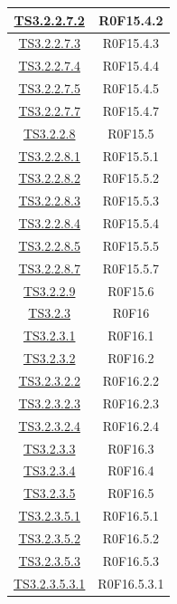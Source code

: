 \documentclass[../PianoDiQualifica.tex]{subfiles}
\begin{document}
\begin{longtable}{|c|c|}
		\hline
		\hyperlink{TS3.2.2.7.2}{TS3.2.2.7.2} & R0F15.4.2   \\
		\hline
		\hyperlink{TS3.2.2.7.3}{TS3.2.2.7.3} & R0F15.4.3   \\
		\hline
		\hyperlink{TS3.2.2.7.4}{TS3.2.2.7.4} & R0F15.4.4   \\
		\hline
		\hyperlink{TS3.2.2.7.5}{TS3.2.2.7.5} & R0F15.4.5   \\
		\hline
		\hyperlink{TS3.2.2.7.7}{TS3.2.2.7.7} & R0F15.4.7   \\
		\hline
		\hyperlink{TS3.2.2.8}{TS3.2.2.8} & R0F15.5   \\
		\hline
		\hyperlink{TS3.2.2.8.1}{TS3.2.2.8.1} & R0F15.5.1   \\
		\hline
		\hyperlink{TS3.2.2.8.2}{TS3.2.2.8.2} & R0F15.5.2   \\
		\hline
		\hyperlink{TS3.2.2.8.3}{TS3.2.2.8.3} & R0F15.5.3   \\
		\hline
		\hyperlink{TS3.2.2.8.4}{TS3.2.2.8.4} & R0F15.5.4   \\
		\hline
		\hyperlink{TS3.2.2.8.5}{TS3.2.2.8.5} & R0F15.5.5   \\
		\hline
		\hyperlink{TS3.2.2.8.7}{TS3.2.2.8.7} & R0F15.5.7   \\
		\hline
		\hyperlink{TS3.2.2.9}{TS3.2.2.9} & R0F15.6   \\
		\hline
		\hyperlink{TS3.2.3}{TS3.2.3} & R0F16   \\
		\hline
		\hyperlink{TS3.2.3.1}{TS3.2.3.1} & R0F16.1   \\
		\hline
		\hyperlink{TS3.2.3.2}{TS3.2.3.2} & R0F16.2   \\
		\hline
		\hyperlink{TS3.2.3.2.2}{TS3.2.3.2.2} & R0F16.2.2   \\
		\hline
		\hyperlink{TS3.2.3.2.3}{TS3.2.3.2.3} & R0F16.2.3   \\
		\hline
		\hyperlink{TS3.2.3.2.4}{TS3.2.3.2.4} & R0F16.2.4   \\
		\hline
		\hyperlink{TS3.2.3.3}{TS3.2.3.3} & R0F16.3   \\
		\hline
		\hyperlink{TS3.2.3.4}{TS3.2.3.4} & R0F16.4   \\
		\hline
		\hyperlink{TS3.2.3.5}{TS3.2.3.5} & R0F16.5   \\
		\hline
		\hyperlink{TS3.2.3.5.1}{TS3.2.3.5.1} & R0F16.5.1   \\
		\hline
		\hyperlink{TS3.2.3.5.2}{TS3.2.3.5.2} & R0F16.5.2   \\
		\hline
		\hyperlink{TS3.2.3.5.3}{TS3.2.3.5.3} & R0F16.5.3   \\
		\hline
		\hyperlink{TS3.2.3.5.3.1}{TS3.2.3.5.3.1} & R0F16.5.3.1   \\

\end{longtable}
\end{document}
